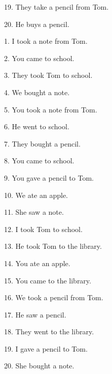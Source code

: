 \documentclass[uplatex,
paper=a4,
fontsize=18pt,
jafontsize=16pt,
number_of_lines=30,
line_length=30zh,
baselineskip=25pt,
]{jlreq}
\begin{document}
19.  They take a pencil from Tom.

20.  He buys a pencil.


\newpage
{}
1.  I took a note from Tom.

2.  You came to school.

3.  They took Tom to school.

4.  We bought a note.

5.  You took a note from Tom.

6.  He went to school.

7.  They bought a pencil.

8.  You came to school.

9.  You gave a pencil to Tom.

10.  We ate an apple.

11.  She saw a note.

12.  I took Tom to school.

13.  He took Tom to the library.

14.  You ate an apple.

15.  You came to the library.

16.  We took a pencil from Tom.

17.  He saw a pencil.

18.  They went to the library.

19.  I gave a pencil to Tom.

20.  She bought a note.
\end{document}
